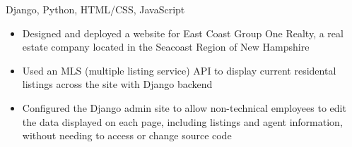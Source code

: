 \documentclass{article}
\begin{document}
{Django, Python, HTML/CSS, JavaScript}
{\begin{itemize}
  \setlength\itemsep{0.025em}
  \item Designed and deployed a website for East Coast Group One Realty, a real estate company located in the Seacoast Region of New Hampshire
  \item Used an MLS (multiple listing service) API to display current residental listings across the site with Django backend
  \item Configured the Django admin site to allow non-technical employees to edit the data displayed on each page, including listings and agent information, without needing to access or change source code
\end{itemize}}
\end{document}
